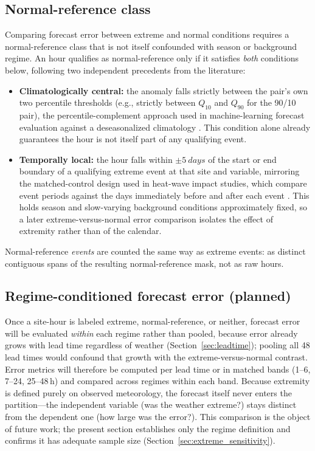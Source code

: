 \subsection{Normal-reference class}\label{sec:normal_reference}

Comparing forecast error between extreme and normal conditions requires a normal-reference class
that is not itself confounded with season or background regime. An hour qualifies as
normal-reference only if it satisfies \emph{both} conditions below, following two independent
precedents from the literature:

\begin{itemize}
  \item \textbf{Climatologically central:} the anomaly falls strictly between the pair's own two
        percentile thresholds (e.g., strictly between $Q_{10}$ and $Q_{90}$ for the 90/10 pair),
        the percentile-complement approach used in machine-learning forecast evaluation against a
        deseasonalized climatology \citep{lam2023}. This condition alone already guarantees the
        hour is not itself part of any qualifying event.
  \item \textbf{Temporally local:} the hour falls within $\pm\SI{5}{days}$ of the start or end
        boundary of a qualifying extreme event at that site and variable, mirroring the
        matched-control design used in heat-wave impact studies, which compare event periods
        against the days immediately before and after each event \citep{kong2024}. This holds
        season and slow-varying background conditions approximately fixed, so a later
        extreme-versus-normal error comparison isolates the effect of extremity rather than of
        the calendar.
\end{itemize}

Normal-reference \emph{events} are counted the same way as extreme events: as distinct contiguous
spans of the resulting normal-reference mask, not as raw hours.

\subsection{Regime-conditioned forecast error (planned)}\label{sec:regime_forecast_error}

Once a site-hour is labeled extreme, normal-reference, or neither, forecast error will be
evaluated \emph{within} each regime rather than pooled, because error already grows with lead time
regardless of weather (Section~\ref{sec:leadtime}); pooling all 48 lead times would confound that
growth with the extreme-versus-normal contrast. Error metrics will therefore be computed per lead
time or in matched bands (1--6, 7--24, 25--48\,h) and compared across regimes within each band.
Because extremity is defined purely on observed meteorology, the forecast itself never enters the
partition---the independent variable (was the weather extreme?) stays distinct from the dependent
one (how large was the error?). This comparison is the object of future work; the present
section establishes only the regime definition and confirms it has adequate sample size
(Section~\ref{sec:extreme_sensitivity}).

